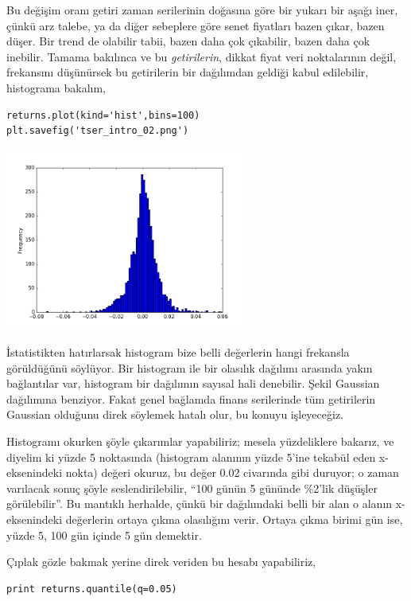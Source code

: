 \documentclass[12pt,fleqn]{article}\usepackage{../../common}
\begin{document}
Bu değişim oranı getiri zaman serilerinin doğasına göre bir yukarı bir aşağı
iner, çünkü arz talebe, ya da diğer sebeplere göre senet fiyatları bazen çıkar,
bazen düşer. Bir trend de olabilir tabii, bazen daha çok çıkabilir, bazen daha
çok inebilir. Tamama bakılınca ve bu {\em getirilerin}, dikkat fiyat veri
noktalarının değil, frekansını düşünürsek bu getirilerin bir dağılımdan geldiği
kabul edilebilir, histograma bakalım,

\begin{verbatim}
returns.plot(kind='hist',bins=100)
plt.savefig('tser_intro_02.png')
\end{verbatim}

\includegraphics[height=6cm]{tser_intro_02.png}

İstatistikten hatırlarsak histogram bize belli değerlerin hangi frekansla
görüldüğünü söylüyor. Bir histogram ile bir olasılık dağılımı arasında yakın
bağlantılar var, histogram bir dağılımın sayısal hali denebilir. Şekil Gaussian
dağılımına benziyor. Fakat genel bağlamda finans serilerinde tüm getirilerin
Gaussian olduğunu direk söylemek hatalı olur, bu konuyu işleyeceğiz.

Histogramı okurken şöyle çıkarımlar yapabiliriz; mesela yüzdeliklere bakarız, ve
diyelim ki yüzde 5 noktasında (histogram alanının yüzde 5'ine tekabül eden
x-eksenindeki nokta) değeri okuruz, bu değer 0.02 civarında gibi duruyor; o
zaman varılacak sonuç şöyle seslendirilebilir, ``100 günün 5 gününde \%2'lik
düşüşler görülebilir''.  Bu mantıklı herhalde, çünkü bir dağılımdaki belli bir
alan o alanın x-eksenindeki değerlerin ortaya çıkma olasılığını verir. Ortaya
çıkma birimi gün ise, yüzde 5, 100 gün içinde 5 gün demektir.

Çıplak gözle bakmak yerine direk veriden bu hesabı yapabiliriz,

\begin{verbatim}
print returns.quantile(q=0.05)
\end{verbatim}
\end{document}
